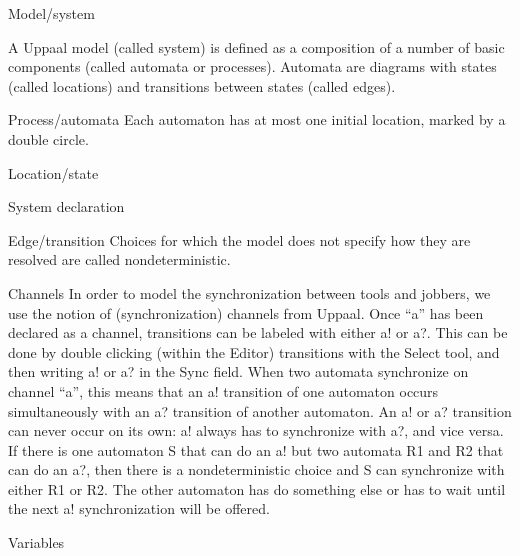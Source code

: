 \documentclass{beamer}
\begin{document}
\begin{frame}{Model/system}
	
	A Uppaal model (called system) is defined as a composition of a number of basic components (called automata or processes). Automata are diagrams with states
	(called locations) and transitions between states (called edges).\newline

\end{frame}

\begin{frame}{Process/automata}
	Each automaton has at most one initial location, marked
	by a double circle.
\end{frame}

\begin{frame}{Location/state}

\end{frame}

\begin{frame}{System declaration}
	
\end{frame}

\begin{frame}{Edge/transition}
	Choices for which the model does not specify how they are resolved are called
	nondeterministic.
\end{frame}

\begin{frame}{Channels}
	In order to model the synchronization between tools and jobbers,
	we use the notion of (synchronization) channels from Uppaal. Once “a” has been
	declared as a channel, transitions can be labeled with either a! or a?. This can be
	done by double clicking (within the Editor) transitions with the Select tool, and then
	writing a! or a? in the Sync field. When two automata synchronize on channel “a”,
	this means that an a! transition of one automaton occurs simultaneously with an
	a? transition of another automaton. An a! or a? transition can never occur on its
	own: a! always has to synchronize with a?, and vice versa. If there is one automaton
	S that can do an a! but two automata R1 and R2 that can do an a?, then there is
	a nondeterministic choice and S can synchronize with either R1 or R2. The other
	automaton has do something else or has to wait until the next a! synchronization
	will be offered.
\end{frame}

\begin{frame}{Variables}
	
\end{frame}
\end{document}

